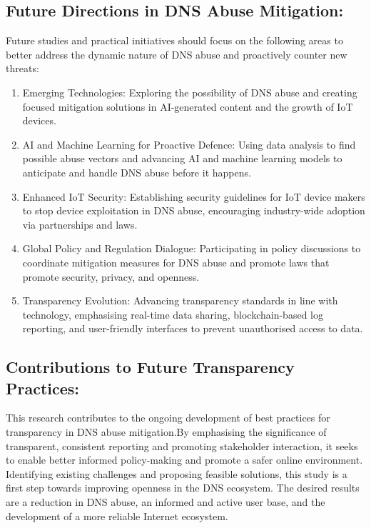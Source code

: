 \subsection{Future Directions in DNS Abuse Mitigation: }

Future studies and practical initiatives should focus on the following areas to better address the dynamic nature of DNS abuse and proactively counter new threats:

\begin{enumerate}
    \item Emerging Technologies: Exploring the possibility of DNS abuse and creating focused mitigation solutions in AI-generated content and the growth of IoT devices.

    \item AI and Machine Learning for Proactive Defence: Using data analysis to find possible abuse vectors and advancing AI and machine learning models to anticipate and handle DNS abuse before it happens.

    \item Enhanced IoT Security: Establishing security guidelines for IoT device makers to stop device exploitation in DNS abuse, encouraging industry-wide adoption via partnerships and laws.

    \item Global Policy and Regulation Dialogue: Participating in policy discussions to coordinate mitigation measures for DNS abuse and promote laws that promote security, privacy, and openness.

    \item Transparency Evolution: Advancing transparency standards in line with technology, emphasising real-time data sharing, blockchain-based log reporting, and user-friendly interfaces to prevent unauthorised access to data.

    
\end{enumerate}


\subsection{Contributions to Future Transparency Practices:}

This research contributes to the ongoing development of best practices for transparency in DNS abuse mitigation.By emphasising the significance of transparent, consistent reporting and promoting stakeholder interaction, it seeks to enable better informed policy-making and promote a safer online environment. Identifying existing challenges and proposing feasible solutions, this study is a first step towards improving openness in the DNS ecosystem. The desired results are a reduction in DNS abuse, an informed and active user base, and the development of a more reliable Internet ecosystem.


